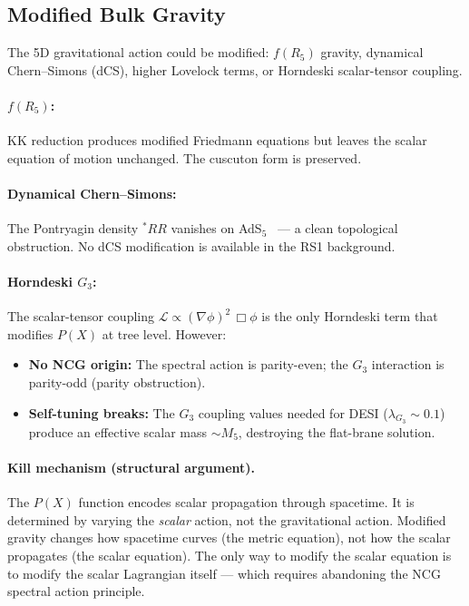 \subsection{Modified Bulk Gravity}
\label{sec:3-modifiedgravity}

The 5D gravitational action could be modified: $f(R_5)$ gravity, dynamical Chern--Simons (dCS), higher Lovelock terms, or Horndeski scalar-tensor coupling.

\paragraph{$f(R_5)$:} KK reduction produces modified Friedmann equations but leaves the scalar equation of motion unchanged. The cuscuton form is preserved.

\paragraph{Dynamical Chern--Simons:} The Pontryagin density ${}^*\!RR$ vanishes on AdS$_5$~\cite{ch3:alexander2009} --- a clean topological obstruction. No dCS modification is available in the RS1 background.

\paragraph{Horndeski $G_3$:} The scalar-tensor coupling $\mathcal{L} \propto (\nabla\phi)^2\,\Box\phi$ is the only Horndeski term that modifies $P(X)$ at tree level. However:
\begin{itemize}
  \item \textbf{No NCG origin:} The spectral action is parity-even; the $G_3$ interaction is parity-odd (parity obstruction).
  \item \textbf{Self-tuning breaks:} The $G_3$ coupling values needed for DESI ($\lambda_{G_3} \sim 0.1$) produce an effective scalar mass ${\sim}M_5$, destroying the flat-brane solution.
\end{itemize}

\paragraph{Kill mechanism (structural argument).} The $P(X)$ function encodes scalar propagation through spacetime. It is determined by varying the \emph{scalar} action, not the gravitational action. Modified gravity changes how spacetime curves (the metric equation), not how the scalar propagates (the scalar equation). The only way to modify the scalar equation is to modify the scalar Lagrangian itself --- which requires abandoning the NCG spectral action principle.

